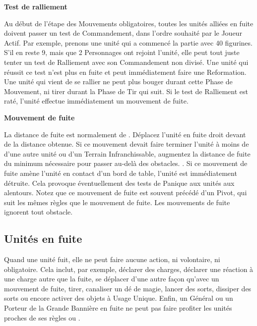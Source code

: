 \noindent\textbf{Test de ralliement}

Au début de l'étape des Mouvements obligatoires, toutes les unités alliées en fuite doivent passer un test de Commandement, dans l'ordre souhaité par le Joueur Actif.  Par exemple, prenons une unité qui a commencé la partie avec 40 figurines. S'il en reste 9, mais que 2 Personnages ont rejoint l'unité, elle peut tout juste tenter un test de Ralliement avec son Commandement non divisé. Une unité qui réussit ce test n'est plus en fuite et peut immédiatement faire une Reformation. Une unité qui vient de se rallier ne peut plus bouger durant cette Phase de Mouvement, ni tirer durant la Phase de Tir qui suit. Si le test de Ralliement est raté, l'unité effectue immédiatement un mouvement de fuite.

\noindent\textbf{Mouvement de fuite}

La distance de fuite est normalement de . Déplacez l'unité en fuite droit devant de la distance obtenue. Si ce mouvement devait faire terminer l'unité à moins de  d'une autre unité ou d'un Terrain Infranchissable, augmentez la distance de fuite du minimum nécessaire pour passer au-delà des obstacles. . Si ce mouvement de fuite amène l'unité en contact d'un bord de table, l'unité est immédiatement détruite. Cela provoque éventuellement des tests de Panique aux unités aux alentours. Notez que ce mouvement de fuite est souvent précédé d'un Pivot, qui suit les mêmes règles que le mouvement de fuite. Les mouvements de fuite ignorent tout obstacle.

\subsection{Unités en fuite}

Quand une unité fuit, elle ne peut faire aucune action, ni volontaire, ni obligatoire. Cela inclut, par exemple, déclarer des charges, déclarer une réaction à une charge autre que la fuite, se déplacer d'une autre façon qu'avec un mouvement de fuite, tirer, canaliser un dé de magie, lancer des sorts, dissiper des sorts ou encore activer des objets à Usage Unique. Enfin, un Général ou un Porteur de la Grande Bannière en fuite ne peut pas faire profiter les unités proches de ses règles \inspiringpresence{} ou \holdyourground{}.


